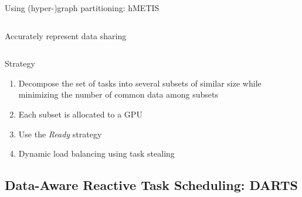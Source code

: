 \documentclass{libs/ufc_format}
\begin{document}
\begin{frame}{Using (hyper-)graph partitioning: hMETIS}
\begin{columns}{}
\begin{column}{0.6\textwidth}
Accurately represent data sharing
\end{column}
\end{columns}
	\begin{block}{Strategy}
	\begin{enumerate}
		\item Decompose the set of tasks into several subsets of similar size while minimizing the number of common data among subsets
		\item Each subset is allocated to a GPU
		\item Use the \emph{Ready} strategy
		\item Dynamic load balancing using task stealing
	\end{enumerate}
	\end{block}
\end{frame}

\subsection{Data-Aware Reactive Task Scheduling: DARTS}


	
\end{document}
